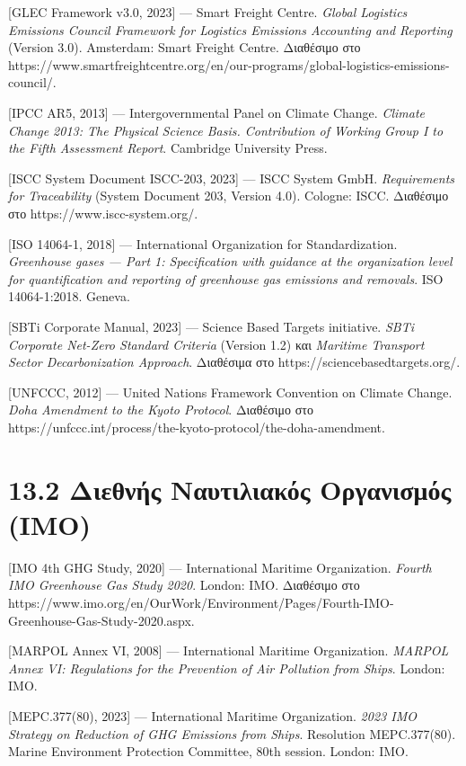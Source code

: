\documentclass[11pt,a4paper,greek,twoside]{template-xe}
\begin{document}
{[}GLEC Framework v3.0, 2023{]} --- Smart Freight Centre. \emph{Global
Logistics Emissions Council Framework for Logistics Emissions Accounting
and Reporting} (Version 3.0). Amsterdam: Smart Freight Centre. Διαθέσιμο
στο
https://www.smartfreightcentre.org/en/our-programs/global-logistics-emissions-council/.

{[}IPCC AR5, 2013{]} --- Intergovernmental Panel on Climate Change.
\emph{Climate Change 2013: The Physical Science Basis. Contribution of
Working Group I to the Fifth Assessment Report}. Cambridge University
Press.

{[}ISCC System Document ISCC-203, 2023{]} --- ISCC System GmbH.
\emph{Requirements for Traceability} (System Document 203, Version 4.0).
Cologne: ISCC. Διαθέσιμο στο https://www.iscc-system.org/.

{[}ISO 14064-1, 2018{]} --- International Organization for
Standardization. \emph{Greenhouse gases --- Part 1: Specification with
guidance at the organization level for quantification and reporting of
greenhouse gas emissions and removals}. ISO 14064-1:2018. Geneva.

{[}SBTi Corporate Manual, 2023{]} --- Science Based Targets initiative.
\emph{SBTi Corporate Net-Zero Standard Criteria} (Version 1.2) και
\emph{Maritime Transport Sector Decarbonization Approach}. Διαθέσιμα στο
https://sciencebasedtargets.org/.

{[}UNFCCC, 2012{]} --- United Nations Framework Convention on Climate
Change. \emph{Doha Amendment to the Kyoto Protocol}. Διαθέσιμο στο
https://unfccc.int/process/the-kyoto-protocol/the-doha-amendment.

\section{13.2 Διεθνής Ναυτιλιακός Οργανισμός
(IMO)}\label{ux3b4ux3b9ux3b5ux3b8ux3bdux3aeux3c2-ux3bdux3b1ux3c5ux3c4ux3b9ux3bbux3b9ux3b1ux3baux3ccux3c2-ux3bfux3c1ux3b3ux3b1ux3bdux3b9ux3c3ux3bcux3ccux3c2-imo}

{[}IMO 4th GHG Study, 2020{]} --- International Maritime Organization.
\emph{Fourth IMO Greenhouse Gas Study 2020}. London: IMO. Διαθέσιμο στο
https://www.imo.org/en/OurWork/Environment/Pages/Fourth-IMO-Greenhouse-Gas-Study-2020.aspx.

{[}MARPOL Annex VI, 2008{]} --- International Maritime Organization.
\emph{MARPOL Annex VI: Regulations for the Prevention of Air Pollution
from Ships}. London: IMO.

{[}MEPC.377(80), 2023{]} --- International Maritime Organization.
\emph{2023 IMO Strategy on Reduction of GHG Emissions from Ships}.
Resolution MEPC.377(80). Marine Environment Protection Committee, 80th
session. London: IMO.
\end{document}
